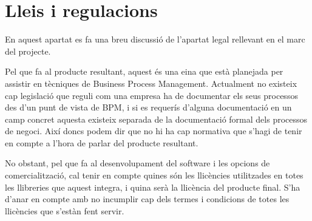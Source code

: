 \section{Lleis i regulacions}
\label{lleis}
En aquest apartat es fa una breu discussió de l'apartat legal rellevant en el marc del projecte.

Pel que fa al producte resultant, aquest és una eina que està planejada per assistir en tècniques de Business Process Management. Actualment no existeix cap legislació que reguli com una empresa ha de documentar els seus processos des d'un punt de vista de BPM, i si es requerís d'alguna documentació en un camp concret aquesta existeix separada de la documentació formal dels processos de negoci. Així doncs podem dir que no hi ha cap normativa que s'hagi de tenir en compte a l'hora de parlar del producte resultant.

No obstant, pel que fa al desenvolupament del software i les opcions de comercialització, cal tenir en compte quines són les llicències utilitzades en totes les llibreries que aquest integra, i quina serà la llicència del producte final. S'ha d'anar en compte amb no incumplir cap dels termes i condicions de totes les llicències que s'estàn fent servir. 


